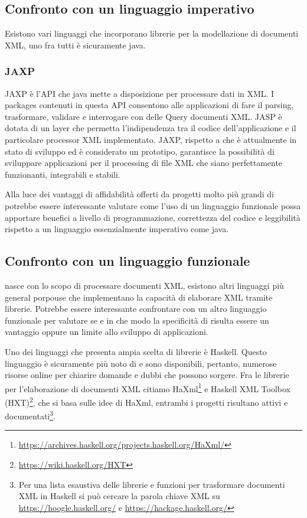 \subsection{Confronto con un linguaggio imperativo}
Esistono vari linguaggi che incorporano librerie per la modellazione di documenti XML, uno fra tutti è sicuramente java.
\subsubsection{JAXP}
JAXP\cite{JAXP} è l'API che java mette a disposizione per processare dati in XML. I packages contenuti in questa API consentono alle applicazioni di fare il parsing, trasformare, validare e interrogare con delle Query documenti XML. JASP è dotata di un layer che permetta l'indipendenza tra il codice dell'applicazione e il particolare processor XML implementato. JAXP, rispetto a \cduce che è attualmente in stato di sviluppo ed è considerato un prototipo, garantisce la possibilità di sviluppare applicazioni per il processing di file XML che siano perfettamente funzionanti, integrabili e stabili.

Alla luce dei vantaggi di affidabilità offerti da progetti molto più grandi di \cduce potrebbe essere interessante valutare come l'uso di un linguaggio funzionale possa apportare benefici a livello di programmazione, correttezza del codice e leggibilità rispetto a un linguaggio essenzialmente imperativo come java.
\subsection{Confronto con un linguaggio funzionale}
\cduce nasce con lo scopo di processare documenti XML, esistono altri linguaggi più general porpouse che implementano la capacità di elaborare XML tramite librerie. Potrebbe essere interessante confrontare \cduce con un altro linguaggio funzionale per valutare se e in che modo la specificità di \cduce risulta essere un vantaggio oppure un limite allo sviluppo di applicazioni.

Uno dei linguaggi che presenta ampia scelta di librerie è Haskell. Questo linguaggio è sicuramente più noto di \cduce e sono disponibili, pertanto, numerose risorse online per chiarire domande e dubbi che possono sorgere. Fra le librerie per l'elaborazione di documenti XML citiamo HaXml\footnote{\url{https://archives.haskell.org/projects.haskell.org/HaXml/}} e Haskell XML Toolbox (HXT)\footnote{\url{https://wiki.haskell.org/HXT}}, che si basa sulle idee di HaXml, entrambi i progetti risultano attivi e documentati\footnote{Per una lista esaustiva delle librerie e funzioni per trasformare documenti XML in Haskell si può cercare la parola chiave XML su \url{https://hoogle.haskell.org/} e \url{https://hackage.haskell.org/}}.

